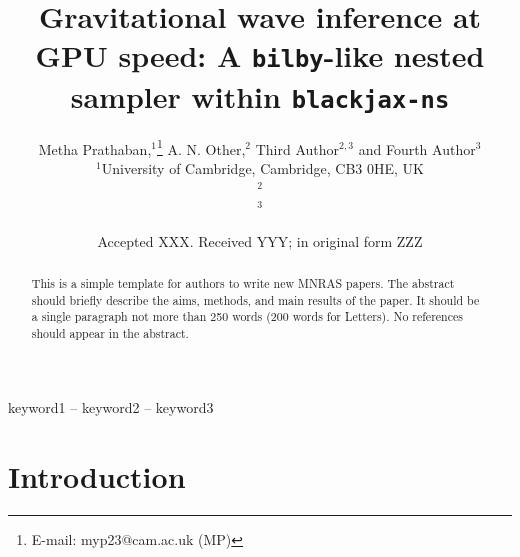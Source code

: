 \documentclass[fleqn,usenatbib]{mnras}
\title[Short title, max. 45 characters]{Gravitational wave inference at GPU speed: A \texttt{bilby}-like nested sampler within \texttt{blackjax-ns}}
\author[Metha Prathaban et al.]{
Metha Prathaban,$^{1}$\thanks{E-mail: myp23@cam.ac.uk (MP)}
A. N. Other,$^{2}$
Third Author$^{2,3}$
and Fourth Author$^{3}$
\\
$^{1}$University of Cambridge, Cambridge, CB3 0HE, UK\\
$^{2}$\\
$^{3}$
}
\date{Accepted XXX. Received YYY; in original form ZZZ}
\begin{document}
\label{firstpage}
\pagerange{\pageref{firstpage}--\pageref{lastpage}}
\maketitle

\begin{abstract}
This is a simple template for authors to write new MNRAS papers.
The abstract should briefly describe the aims, methods, and main results of the paper.
It should be a single paragraph not more than 250 words (200 words for Letters).
No references should appear in the abstract.
\end{abstract}

\begin{keywords}
keyword1 -- keyword2 -- keyword3
\end{keywords}



\section{Introduction}






\end{document}

